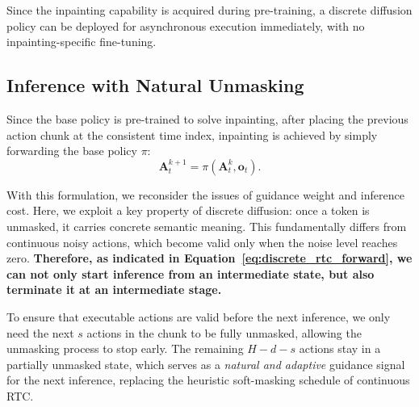 \documentclass{article}
\begin{document}
Since the inpainting capability is acquired during pre-training, a discrete diffusion policy can be deployed for asynchronous execution immediately, with no inpainting-specific fine-tuning.

\subsection{Inference with Natural Unmasking}
\label{sec:method_unmasking}

Since the base policy is pre-trained to solve inpainting, after placing the previous action chunk at the consistent time index, inpainting is achieved by simply forwarding the base policy $\pi$:
\begin{equation}
    \label{eq:discrete_rtc_forward}
    \mathbf{A}_t^{k+1} = \pi(\mathbf{A}_t^k, \mathbf{o}_t).
\end{equation}

With this formulation, we reconsider the issues of guidance weight and inference cost.
Here, we exploit a key property of discrete diffusion: once a token is unmasked, it carries concrete semantic meaning.
This fundamentally differs from continuous noisy actions, which become valid only when the noise level reaches zero.
\textbf{Therefore, as indicated in Equation~\ref{eq:discrete_rtc_forward}, we can not only start inference from an intermediate state, but also terminate it at an intermediate stage.}

To ensure that executable actions are valid before the next inference, we only need the next $s$ actions in the chunk to be fully unmasked, allowing the unmasking process to stop early.
The remaining $H - d - s$ actions stay in a partially unmasked state, which serves as a \emph{natural and adaptive} guidance signal for the next inference, replacing the heuristic soft-masking schedule of continuous RTC.
\end{document}
